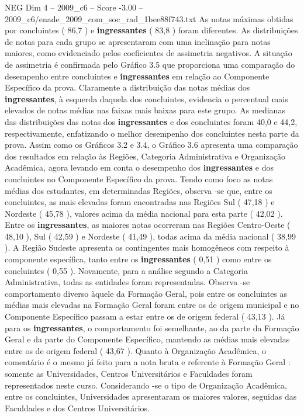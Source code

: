 \begin{textsample}{NEG Dim 4 – 2009\_c6 – Score -3.00 – 2009\_c6/enade\_2009\_com\_soc\_rad\_1bee88f743.txt}
As notas máximas obtidas por concluintes ( 86,7 ) e \textbf{ingressantes} ( 83,8 ) foram diferentes.
As distribuições de notas para cada grupo se apresentaram com uma inclinação para notas maiores, como evidenciado pelos coeficientes de assimetria negativos.
A situação de assimetria é confirmada pelo Gráfico 3.5 que proporciona uma comparação do desempenho entre concluintes e \textbf{ingressantes} em relação ao Componente Específico da prova.
Claramente a distribuição das notas médias dos \textbf{ingressantes}, à esquerda daquela dos concluintes, evidencia o percentual mais elevados de notas médias nas faixas mais baixas para este grupo.
As medianas das distribuições das notas dos \textbf{ingressantes} e dos concluintes foram 40,0 e 44,2, respectivamente, enfatizando o melhor desempenho dos concluintes nesta parte da prova.
Assim como os Gráficos 3.2 e 3.4, o Gráfico 3.6 apresenta uma comparação dos resultados em relação às Regiões, Categoria Administrativa e Organização Acadêmica, agora levando em conta o desempenho dos \textbf{ingressantes} e dos concluintes no Componente Específico da prova.
Tendo como foco as notas médias dos estudantes, em determinadas Regiões, observa -se que, entre os concluintes, as mais elevadas foram encontradas nas Regiões Sul ( 47,18 ) e Nordeste ( 45,78 ), valores acima da média nacional para esta parte ( 42,02 ).
Entre os \textbf{ingressantes}, as maiores notas ocorreram nas Regiões Centro-Oeste ( 48,10 ), Sul ( 42,59 ) e Nordeste ( 41,49 ), todas acima da média nacional ( 38,99 ).
A Região Sudeste apresenta os contingentes mais homogêneos com respeito à componente específica, tanto entre os \textbf{ingressantes} ( 0,51 ) como entre os concluintes ( 0,55 ).
Novamente, para a análise segundo a Categoria Administrativa, todas as entidades foram representadas.
Observa -se comportamento diverso àquele da Formação Geral, pois entre os concluintes as médias mais elevadas na Formação Geral foram entre os de origem municipal e no Componente Específico passam a estar entre os de origem federal ( 43,13 ).
Já para os \textbf{ingressantes}, o comportamento foi semelhante, ao da parte da Formação Geral e da parte do Componente Específico, mantendo as médias mais elevadas entre os de origem federal ( 43,67 ).
Quanto à Organização Acadêmica, o comentário é o mesmo já feito para a nota bruta e referente à Formação Geral : somente as Universidades, Centros Universitários e Faculdades foram representados neste curso.
Considerando -se o tipo de Organização Acadêmica, entre os concluintes, Universidades apresentaram os maiores valores, seguidas das Faculdades e dos Centros Universitários.

\end{textsample}

